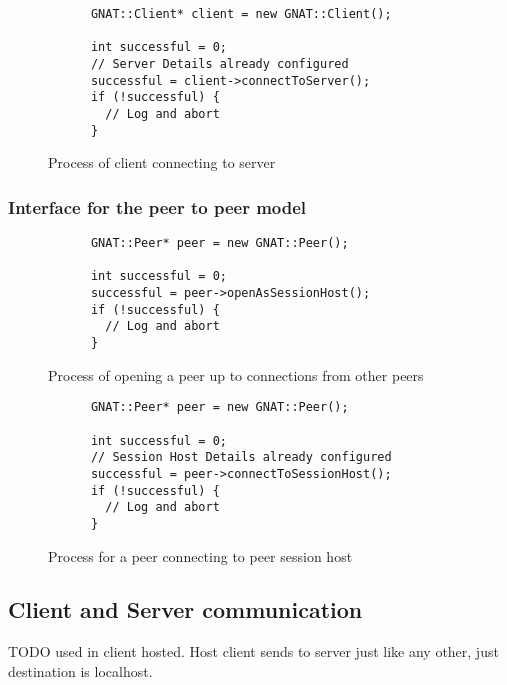 \begin{figure}[!h]
  \centering
  \begin{lstlisting}
      GNAT::Client* client = new GNAT::Client();

      int successful = 0;
      // Server Details already configured
      successful = client->connectToServer();
      if (!successful) {
        // Log and abort
      }
  \end{lstlisting}
  \caption{Process of client connecting to server}
  \label{code:client_conn}
\end{figure}

\newpage
\subsubsection{Interface for the peer to peer model}

\begin{figure}[!h]
  \centering
  \begin{lstlisting}
      GNAT::Peer* peer = new GNAT::Peer();

      int successful = 0;
      successful = peer->openAsSessionHost();
      if (!successful) {
        // Log and abort
      }
  \end{lstlisting}
  \caption{Process of opening a peer up to connections from other peers}
  \label{code:peer_conn_host}
\end{figure}


\begin{figure}[!h]
  \centering
  \begin{lstlisting}
      GNAT::Peer* peer = new GNAT::Peer();

      int successful = 0;
      // Session Host Details already configured
      successful = peer->connectToSessionHost();
      if (!successful) {
        // Log and abort
      }
  \end{lstlisting}
  \caption{Process for a peer connecting to peer session host}
  \label{code:peer_conn_join}
\end{figure}

\newpage

\subsection{Client and Server communication}
TODO used in client hosted. Host client sends to server just like any other, just destination is localhost.








